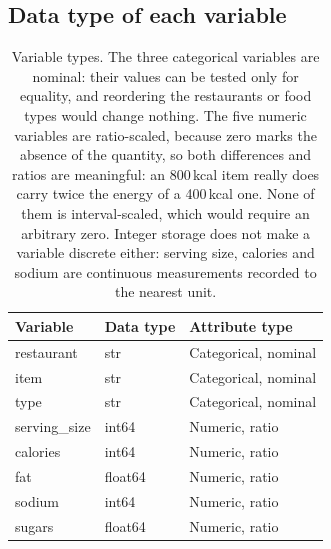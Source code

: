 \documentclass[11pt]{article}
\begin{document}
\subsection*{Data type of each variable}
\begin{table}[H]\centering\small
\begin{tabular}{lll}
\toprule
Variable & Data type & Attribute type \\
\midrule
restaurant    & str     & Categorical, nominal \\
item          & str     & Categorical, nominal \\
type          & str     & Categorical, nominal \\
serving\_size & int64   & Numeric, ratio \\
calories      & int64   & Numeric, ratio \\
fat           & float64 & Numeric, ratio \\
sodium        & int64   & Numeric, ratio \\
sugars        & float64 & Numeric, ratio \\
\bottomrule
\end{tabular}
\caption{Variable types. The three categorical variables are nominal: their values can be
tested only for equality, and reordering the restaurants or food types would change
nothing. The five numeric variables are ratio-scaled, because zero marks the absence of
the quantity, so both differences and ratios are meaningful: an 800\,kcal item really does
carry twice the energy of a 400\,kcal one. None of them is interval-scaled, which would
require an arbitrary zero. Integer storage does not make a variable discrete either:
serving size, calories and sodium are continuous measurements recorded to the nearest unit.}
\label{tab:dtypes}
\end{table}
\end{document}
